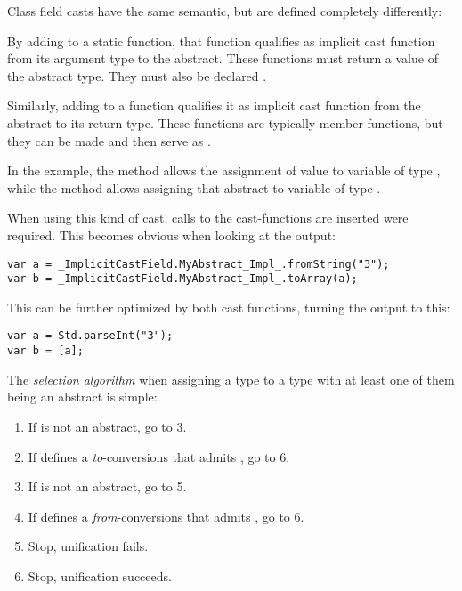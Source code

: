 Class field casts have the same semantic, but are defined completely differently:

By adding  to a static function, that function qualifies as implicit cast function from its argument type to the abstract. These functions must return a value of the abstract type. They must also be declared .

Similarly, adding  to a function qualifies it as implicit cast function from the abstract to its return type. These functions are typically member-functions, but they can be made  and then serve as .

In the example, the method  allows the assignment of value  to variable  of type , while the method  allows assigning that abstract to variable  of type .

When using this kind of cast, calls to the cast-functions are inserted were required. This becomes obvious when looking at the  output:

\begin{lstlisting}
var a = _ImplicitCastField.MyAbstract_Impl_.fromString("3");
var b = _ImplicitCastField.MyAbstract_Impl_.toArray(a);
\end{lstlisting}
This can be further optimized by  both cast functions, turning the output to this:

\begin{lstlisting}
var a = Std.parseInt("3");
var b = [a];
\end{lstlisting}
The \emph{selection algorithm} when assigning a type  to a type  with at least one of them being an abstract is simple:

\begin{enumerate}
	\item If  is not an abstract, go to 3.
	\item If  defines a \emph{to}-conversions that admits , go to 6.
	\item If  is not an abstract, go to 5.
	\item If  defines a \emph{from}-conversions that admits , go to 6.
	\item Stop, unification fails.
	\item Stop, unification succeeds.
\end{enumerate}

